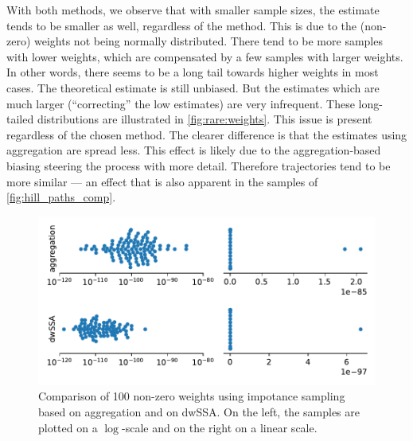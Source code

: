 With both methods, we observe that with smaller sample sizes, the
estimate tends to be smaller as well, regardless of the method.
This is due to the (non-zero) weights not being normally distributed.
There tend to be more samples with lower weights, which are
compensated by a few samples with larger weights.
In other words, there seems to be a long tail towards higher weights
in most cases.
The theoretical estimate is still unbiased.
But the estimates which are much larger (``correcting'' the low
estimates) are very infrequent.
These long-tailed distributions are illustrated in \autoref{fig:rare:weights}.
This issue is present regardless of the chosen method.
The clearer difference is that the estimates using aggregation are spread less.
This effect is likely due to the aggregation-based biasing steering
the process with more detail.
Therefore trajectories tend to be more similar --- an effect that is
also apparent in the samples of \autoref{fig:hill_paths_comp}.
\begin{figure}[htb]
  \centering
  \includegraphics[scale=.55]{gfx/weights.pdf}
  \caption[Weight distribution of different \ac{IS}
  methods]{\label{fig:rare:weights}Comparison of \num{100} non-zero
    weights using impotance sampling based on aggregation and on dwSSA.
    On the left, the samples are plotted on a $\log$-scale and on the
  right on a linear scale.}
\end{figure}

